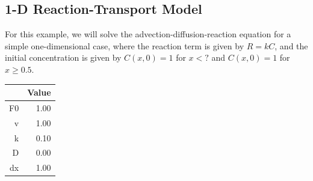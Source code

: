 \documentclass{tufte-handout}\usepackage[]{graphicx}\usepackage[]{xcolor}
\begin{document}
\subsection{1-D Reaction-Transport Model}

For this example, we will solve the advection-diffusion-reaction equation for a simple one-dimensional case, where the reaction term is given by $R = kC$, and the initial concentration is given by $C(x,0) = 1$ for $x < ?$ and $C(x,0) = 1$ for $x \geq 0.5$. 



\begin{table}[ht]
\centering
\begin{tabular}{rr}
  \hline
 & Value \\ 
  \hline
F0 & 1.00 \\ 
  v & 1.00 \\ 
  k & 0.10 \\ 
  D & 0.00 \\ 
  dx & 1.00 \\ 
   \hline
\end{tabular}
\end{table}
\end{document}
